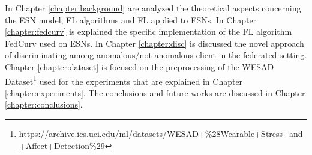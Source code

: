 In Chapter \ref{chapter:background} are analyzed the theoretical aspects concerning the ESN model, FL algorithms and FL applied to ESNs. In Chapter \ref{chapter:fedcurv} is explained the specific implementation of the FL algorithm FedCurv used on ESNs. In Chapter \ref{chapter:disc} is discussed the novel approach of discriminating among anomalous/not anomalous client in the federated setting. Chapter \ref{chapter:dataset} is focused on the preprocessing of the WESAD Dataset\footnote{\url{https://archive.ics.uci.edu/ml/datasets/WESAD+\%28Wearable+Stress+and+Affect+Detection\%29}} used for the experiments that are explained in Chapter \ref{chapter:experiments}. The conclusions and future works are discussed in Chapter \ref{chapter:conclusions}.